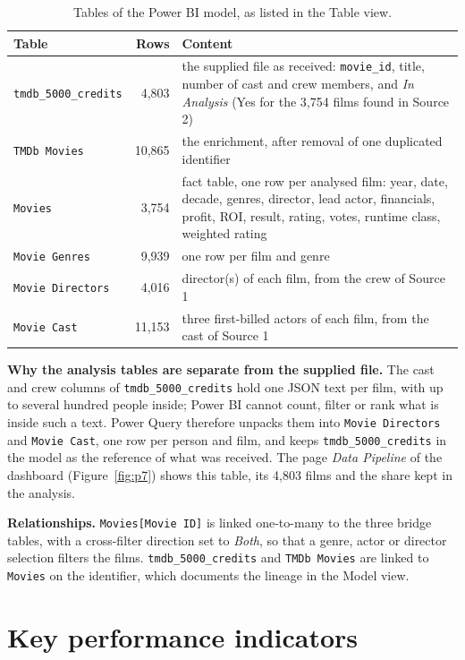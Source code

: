\documentclass[12pt,a4paper]{article}
\begin{document}
\begin{table}[H]\centering\small
\caption{Tables of the Power BI model, as listed in the Table view.}
\begin{tabularx}{\linewidth}{@{}lrX@{}}
\toprule
Table & Rows & Content\\\midrule
\texttt{tmdb\_5000\_credits} & 4{,}803 & the supplied file as received: \texttt{movie\_id}, title, number of cast and crew members, and \emph{In Analysis} (Yes for the 3{,}754 films found in Source 2)\\
\texttt{TMDb Movies} & 10{,}865 & the enrichment, after removal of one duplicated identifier\\
\texttt{Movies} & 3{,}754 & fact table, one row per analysed film: year, date, decade, genres, director, lead actor, financials, profit, ROI, result, rating, votes, runtime class, weighted rating\\
\texttt{Movie Genres} & 9{,}939 & one row per film and genre\\
\texttt{Movie Directors} & 4{,}016 & director(s) of each film, from the crew of Source 1\\
\texttt{Movie Cast} & 11{,}153 & three first-billed actors of each film, from the cast of Source 1\\
\bottomrule
\end{tabularx}
\end{table}

\textbf{Why the analysis tables are separate from the supplied file.} The cast and crew
columns of \texttt{tmdb\_5000\_credits} hold one JSON text per film, with up to several
hundred people inside; Power BI cannot count, filter or rank what is inside such a text.
Power Query therefore unpacks them into \texttt{Movie Directors} and \texttt{Movie Cast},
one row per person and film, and keeps \texttt{tmdb\_5000\_credits} in the model as the
reference of what was received. The page \emph{Data Pipeline} of the dashboard
(Figure~\ref{fig:p7}) shows this table, its 4{,}803 films and the share kept in the analysis.

\textbf{Relationships.} \texttt{Movies[Movie ID]} is linked one-to-many to the three bridge
tables, with a cross-filter direction set to \emph{Both}, so that a genre, actor or
director selection filters the films. \texttt{tmdb\_5000\_credits} and \texttt{TMDb Movies}
are linked to \texttt{Movies} on the identifier, which documents the lineage in the
Model view.

\section{Key performance indicators}
\end{document}
